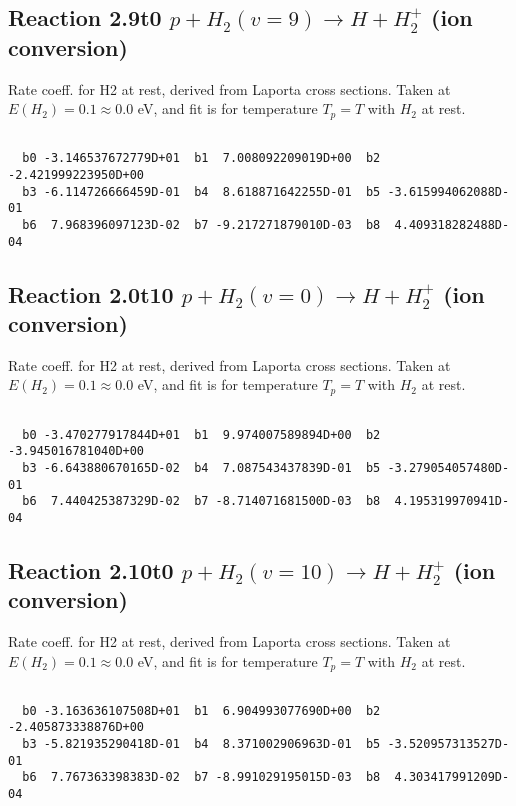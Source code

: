\documentclass[12pt,dvipdfmx]{article}
\begin{document}
\newpage
\subsection{
Reaction 2.9t0
$ p + H_2(v=9) \rightarrow H + H_2^+$ (ion conversion)
}
Rate coeff. for H2 at rest, derived from Laporta cross sections.
Taken at $E(H_2) = 0.1 \approx 0.0$ eV,  and fit is for temperature $T_p=T$ with $H_2$ at rest.

\begin{small}\begin{verbatim}

  b0 -3.146537672779D+01  b1  7.008092209019D+00  b2 -2.421999223950D+00
  b3 -6.114726666459D-01  b4  8.618871642255D-01  b5 -3.615994062088D-01
  b6  7.968396097123D-02  b7 -9.217271879010D-03  b8  4.409318282488D-04

\end{verbatim}\end{small}

\newpage
\subsection{
Reaction 2.0t10
$ p + H_2(v=0) \rightarrow H + H_2^+$ (ion conversion)
}
Rate coeff. for H2 at rest, derived from Laporta cross sections.
Taken at $E(H_2) = 0.1 \approx 0.0$ eV,  and fit is for temperature $T_p=T$ with $H_2$ at rest.

\begin{small}\begin{verbatim}

  b0 -3.470277917844D+01  b1  9.974007589894D+00  b2 -3.945016781040D+00
  b3 -6.643880670165D-02  b4  7.087543437839D-01  b5 -3.279054057480D-01
  b6  7.440425387329D-02  b7 -8.714071681500D-03  b8  4.195319970941D-04

\end{verbatim}\end{small}

\newpage
\subsection{
Reaction 2.10t0
$ p + H_2(v=10) \rightarrow H + H_2^+$ (ion conversion)
}
Rate coeff. for H2 at rest, derived from Laporta cross sections.
Taken at $E(H_2) = 0.1 \approx 0.0$ eV,  and fit is for temperature $T_p=T$ with $H_2$ at rest.

\begin{small}\begin{verbatim}

  b0 -3.163636107508D+01  b1  6.904993077690D+00  b2 -2.405873338876D+00
  b3 -5.821935290418D-01  b4  8.371002906963D-01  b5 -3.520957313527D-01
  b6  7.767363398383D-02  b7 -8.991029195015D-03  b8  4.303417991209D-04

\end{verbatim}\end{small}
\end{document}
